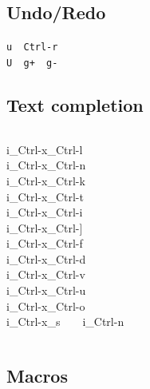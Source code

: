 \documentclass[14pt,svgnames,compress]{beamer}
\newcommand\hl[1]{\textcolor{HlColor}{#1}}
\newcommand\framesubtitlefontsize{\huge}
\newcommand\singleframesubtitle[1]{
    \begin{center}
        \framesubtitlefontsize #1
    \end{center}
}
\newcommand\subtitleframe{
    \begin{frame}
        \singleframesubtitle{\insertsubsectionhead}
    \end{frame}
}
\begin{document}
\subsection{Undo/Redo}

\subtitleframe

\begin{frame}[fragile]
    \begin{spacing}{1.5} %
        \Large
        \centering
        \verb|u  Ctrl-r| \\ \bigskip
        \verb|U  g+  g-|
    \end{spacing}
\end{frame}


\subsection{Text completion}

\subtitleframe

\begin{frame}[fragile]
    \begin{spacing}{1.5} %
        \begin{columns}
                \centering
                i\_Ctrl-x\_Ctrl-\hl{l} \\
                i\_Ctrl-x\_Ctrl-\hl{n} \\
                i\_Ctrl-x\_Ctrl-\hl{k} \\
                i\_Ctrl-x\_Ctrl-\hl{t} \\
                i\_Ctrl-x\_Ctrl-\hl{i} \\
                i\_Ctrl-x\_Ctrl-\hl{]} \\
                \centering
                i\_Ctrl-x\_Ctrl-\hl{f} \\
                i\_Ctrl-x\_Ctrl-\hl{d} \\
                i\_Ctrl-x\_Ctrl-\hl{v} \\
                i\_Ctrl-x\_Ctrl-\hl{u} \\
                i\_Ctrl-x\_Ctrl-\hl{o} \\
                i\_Ctrl-x\_\hl{s}~~~~i\_Ctrl-\hl{n} \\
        \end{columns}
    \end{spacing}
\end{frame}


\subsection{Macros}
\end{document}
